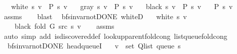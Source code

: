 \begin{isabellebody}
\ \ \ {\isachardoublequoteopen}white\ s\ v\ {\isasymLongrightarrow}\ P\ s\ v{\isachardoublequoteclose}\isanewline
\ \ \ {\isachardoublequoteopen}gray\ s\ v\ {\isasymLongrightarrow}\ P\ s\ v{\isachardoublequoteclose}\isanewline
\ \ \ {\isachardoublequoteopen}black\ s\ v\ {\isasymLongrightarrow}\ P\ s\ v{\isachardoublequoteclose}\isanewline
\ \ \ {\isachardoublequoteopen}P\ s\ v{\isachardoublequoteclose}\isanewline
%
\isadelimproof
\ \ %
\endisadelimproof
%
\isatagproof
{}\isamarkupfalse%
\ assms\isanewline
\ \ \isamarkupfalse%
\ blast%
\endisatagproof
{\isafoldproof}%
%
\isadelimproof
\isanewline
%
\endisadelimproof
%
\isadeliminvisible
\isanewline
%
\endisadeliminvisible
%
\isataginvisible
{}\isamarkupfalse%
\ {\isacharparenleft}{\kern0pt}\ bfs{\isacharunderscore}{\kern0pt}invar{\isacharunderscore}{\kern0pt}not{\isacharunderscore}{\kern0pt}DONE{\isacharparenright}{\kern0pt}\ whiteD{\isacharcolon}{\kern0pt}\isanewline
\ \ \ {\isachardoublequoteopen}white\ s\ v{\isachardoublequoteclose}\isanewline
\ \ \ {\isachardoublequoteopen}{\isasymnot}\ black\ {\isacharparenleft}{\kern0pt}fold\ G\ src\ s{\isacharparenright}{\kern0pt}\ v{\isachardoublequoteclose}%
\endisataginvisible
{\isafoldinvisible}%
%
\isadeliminvisible
\isanewline
%
\endisadeliminvisible
%
\isadelimproof
\ \ %
\endisadelimproof
%
\isatagproof
{}\isamarkupfalse%
\ assms\isanewline
\ \ \isamarkupfalse%
\ {\isacharparenleft}{\kern0pt}auto\ simp\ add{\isacharcolon}{\kern0pt}\ is{\isacharunderscore}{\kern0pt}discovered{\isacharunderscore}{\kern0pt}def\ lookup{\isacharunderscore}{\kern0pt}parent{\isacharunderscore}{\kern0pt}fold{\isacharunderscore}{\kern0pt}cong\ list{\isacharunderscore}{\kern0pt}queue{\isacharunderscore}{\kern0pt}fold{\isacharunderscore}{\kern0pt}cong{\isacharparenright}{\kern0pt}%
\endisatagproof
{\isafoldproof}%
%
\isadelimproof
\isanewline
%
\endisadelimproof
%
\isadeliminvisible
\isanewline
%
\endisadeliminvisible
%
\isataginvisible
{}\isamarkupfalse%
\ {\isacharparenleft}{\kern0pt}\ bfs{\isacharunderscore}{\kern0pt}invar{\isacharunderscore}{\kern0pt}not{\isacharunderscore}{\kern0pt}DONE{\isacharparenright}{\kern0pt}\ head{\isacharunderscore}{\kern0pt}queueI{\isacharunderscore}{\kern0pt}{}{\isacharcolon}{\kern0pt}\isanewline
\ \ \ {\isachardoublequoteopen}v\ {\isasymin}\ set\ {\isacharparenleft}{\kern0pt}Q{\isacharunderscore}{\kern0pt}list\ {\isacharparenleft}{\kern0pt}queue\ s{\isacharparenright}{\kern0pt}{\isacharparenright}{\kern0pt}{\isachardoublequoteclose}\isanewline

\end{isabellebody}
